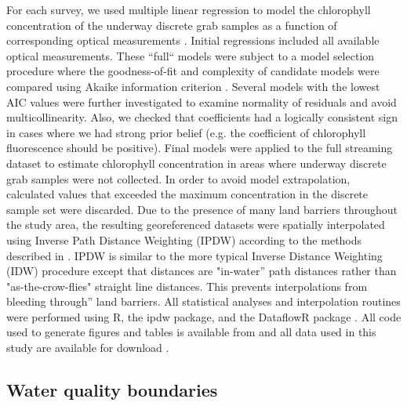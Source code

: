 \documentclass[review]{elsarticle}
\begin{document}
For each survey, we used multiple linear regression to model the chlorophyll concentration of the underway discrete grab samples as a function of corresponding optical measurements \citep{seppala_ship_opportunity_2007,seppala_multivariate_2008}. Initial regressions included all available optical measurements. These “full“ models were subject to a model selection procedure where the goodness-of-fit and complexity of candidate models were compared using Akaike information criterion \citep[AIC;][]{venables2002modern}. Several models with the lowest AIC values were further investigated to examine normality of residuals and avoid multicollinearity. Also, we checked that coefficients had a logically consistent sign in cases where we had strong prior belief (e.g. the coefficient of chlorophyll fluorescence should be positive). 
Final models were applied to the full streaming dataset to estimate chlorophyll concentration in areas where underway discrete grab samples were not collected. In order to avoid model extrapolation, calculated values that exceeded the maximum concentration in the discrete sample set were discarded. Due to the presence of many land barriers throughout the study area, the resulting georeferenced datasets were spatially interpolated using Inverse Path Distance Weighting (IPDW) according to the methods described in \citet{stachelek_application_2015}. IPDW is similar to the more typical Inverse Distance Weighting (IDW) procedure except that distances are "in-water” path distances rather than "as-the-crow-flies" straight line distances. This prevents interpolations from bleeding through” land barriers. All statistical analyses and interpolation routines were performed using R, the ipdw package, and the DataflowR package \citep{rcore_2015,dataflowr, ipdw}. All code used to generate figures and tables is available from \citet{dataflowchl} and all data used in this study are available for download \citep{madden2017}.

\subsection{Water quality boundaries}
\end{document}
